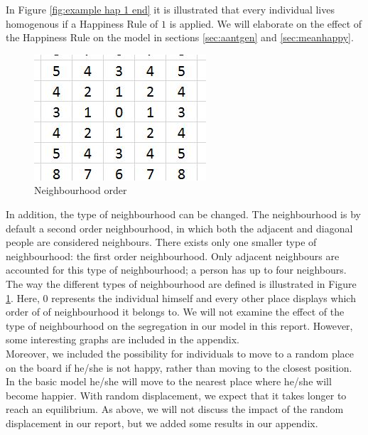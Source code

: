 In Figure \ref{fig:example hap 1 end} it is illustrated that every individual lives homogenous if a Happiness Rule of $1$ is applied.
We will elaborate on the effect of the Happiness Rule on the model in sections \ref{sec:aantgen} and \ref{sec:meanhappy}.\\

\begin{figure}
\vspace{-20pt}
\centering
\includegraphics[scale=0.8]{buurtorde.jpg}
\caption{Neighbourhood order}
\vspace{-10pt}
\label{fig:neighbourhood}
\end{figure}

In addition,  the type of neighbourhood can be changed.
The neighbourhood is  by default a second order neighbourhood, in which both the adjacent and diagonal people are considered neighbours. 
There exists only one smaller type of neighbourhood: the first order neighbourhood. 
Only adjacent neighbours are accounted for this type of neighbourhood; a person has up to four neighbours.
The way the different types of neighbourhood are defined is illustrated in Figure \ref{fig:neighbourhood}.
Here, $0$ represents the individual himself and every other place displays which order of  of neighbourhood it belongs to.
We will not examine the effect of the type of neighbourhood on the segregation in our model in this report.
However, some interesting graphs are included in the appendix.\\

Moreover, we included the possibility for individuals to move to a random place on the board if he/she is not happy, rather than moving to the closest position.
In the basic model he/she will move to the nearest place where he/she will become happier. With random displacement, we expect that it takes longer to reach an equilibrium.
As above, we will not discuss the impact of the random displacement in our report, but we added some results in our appendix.\\


